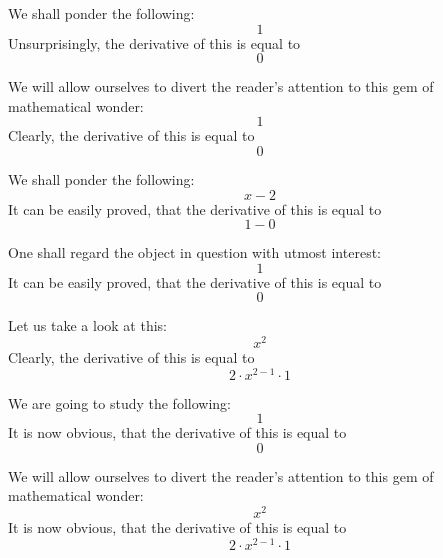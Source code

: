 \documentclass{article}
\begin{document}
We shall ponder the following:
\begin{equation}
1 
\end{equation}
Unsurprisingly, the derivative of this is equal to
\begin{equation}
0 
\end{equation}

We will allow ourselves to divert the reader's attention to this gem of mathematical wonder:
\begin{equation}
1 
\end{equation}
Clearly, the derivative of this is equal to
\begin{equation}
0 
\end{equation}

We shall ponder the following:
\begin{equation}
x - 2 
\end{equation}
It can be easily proved, that the derivative of this is equal to
\begin{equation}
1 - 0 
\end{equation}

One shall regard the object in question with utmost interest:
\begin{equation}
1 
\end{equation}
It can be easily proved, that the derivative of this is equal to
\begin{equation}
0 
\end{equation}

Let us take a look at this:
\begin{equation}
x ^{2 } 
\end{equation}
Clearly, the derivative of this is equal to
\begin{equation}
2 \cdot x ^{2 - 1 } \cdot 1 
\end{equation}

We are going to study the following:
\begin{equation}
1 
\end{equation}
It is now obvious, that the derivative of this is equal to
\begin{equation}
0 
\end{equation}

We will allow ourselves to divert the reader's attention to this gem of mathematical wonder:
\begin{equation}
x ^{2 } 
\end{equation}
It is now obvious, that the derivative of this is equal to
\begin{equation}
2 \cdot x ^{2 - 1 } \cdot 1 
\end{equation}
\end{document}
